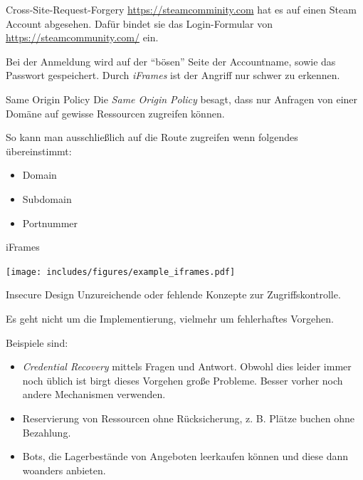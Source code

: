 \begin{example}{Cross-Site-Request-Forgery}
    \href{https://www.youtube.com/watch?v=dQw4w9WgXcQ}{https://steamcomminity.com} hat es auf einen Steam Account abgesehen.
    Dafür bindet sie das Login-Formular von \href{https://steamcommunity.com/}{https://steamcommunity.com/} ein.

    Bei der Anmeldung wird auf der \enquote{bösen} Seite der Accountname, sowie das Passwort gespeichert.
    Durch \emph{iFrames} ist der Angriff nur schwer zu erkennen.
\end{example}

\begin{defi}{Same Origin Policy}
    Die \emph{Same Origin Policy} besagt, dass nur Anfragen von einer Domäne auf gewisse Ressourcen zugreifen können.

    So kann man ausschließlich auf die Route zugreifen wenn folgendes übereinstimmt:
    \begin{itemize}
        \item Domain
        \item Subdomain
        \item Portnummer
    \end{itemize}
\end{defi}

\begin{example}{iFrames}
    \begin{center}
        \texttt{[image: includes/figures/example\_iframes.pdf]}
    \end{center}
\end{example}

\begin{defi}{Insecure Design}
    Unzureichende oder fehlende Konzepte zur Zugriffskontrolle.

    Es geht nicht um die Implementierung, vielmehr um fehlerhaftes Vorgehen.

    Beispiele sind:
    \begin{itemize}
        \item \emph{Credential Recovery} mittels Fragen und Antwort.
              Obwohl dies leider immer noch üblich ist birgt dieses Vorgehen große Probleme.
              Besser vorher noch andere Mechanismen verwenden.
        \item Reservierung von Ressourcen ohne Rücksicherung, z. B. Plätze buchen ohne Bezahlung.
        \item Bots, die Lagerbestände von Angeboten leerkaufen können und diese dann woanders anbieten.
    \end{itemize}
\end{defi}

